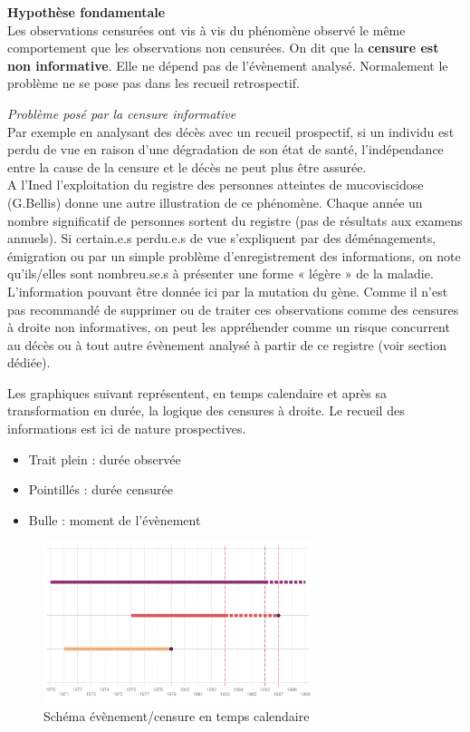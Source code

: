 \documentclass[
  12pt,
  letterpaper,
  DIV=11,
  numbers=noendperiod,
  onepage,
  openany]{scrreprt}
\providecommand{\tightlist}{%
  \setlength{\itemsep}{0pt}\setlength{\parskip}{0pt}}\usepackage{longtable,booktabs,array}
\begin{document}
\textbf{Hypothèse fondamentale}\\
Les observations censurées ont vis à vis du phénomène observé le même
comportement que les observations non censurées. On dit que la
\textbf{censure est non informative}. Elle ne dépend pas de l'évènement
analysé. Normalement le problème ne se pose pas dans les recueil
retrospectif.

\emph{Problème posé par la censure informative}\\
Par exemple en analysant des décès avec un recueil prospectif, si un
individu est perdu de vue en raison d'une dégradation de son état de
santé, l'indépendance entre la cause de la censure et le décès ne peut
plus être assurée.\\
A l'Ined l'exploitation du registre des personnes atteintes de
mucoviscidose (G.Bellis) donne une autre illustration de ce phénomène.
Chaque année un nombre significatif de personnes sortent du registre
(pas de résultats aux examens annuels). Si certain.e.s perdu.e.s de vue
s'expliquent par des déménagements, émigration ou par un simple problème
d'enregistrement des informations, on note qu'ils/elles sont
nombreu.se.s à présenter une forme « légère » de la maladie.
L'information pouvant être donnée ici par la mutation du gène. Comme il
n'est pas recommandé de supprimer ou de traiter ces observations comme
des censures à droite non informatives, on peut les appréhender comme un
risque concurrent au décès ou à tout autre évènement analysé à partir de
ce registre (voir section dédiée).

Les graphiques suivant représentent, en temps calendaire et après sa
transformation en durée, la logique des censures à droite. Le recueil
des informations est ici de nature prospectives.

\begin{itemize}
\tightlist
\item
  Trait plein : durée observée
\item
  Pointillés : durée censurée
\item
  Bulle : moment de l'évènement
\end{itemize}

\begin{figure}

\caption{Schéma évènement/censure en temps calendaire}

{\centering \includegraphics[width=0.7\textwidth,height=\textheight]{images/cens1.png}

}

\end{figure}
\end{document}
